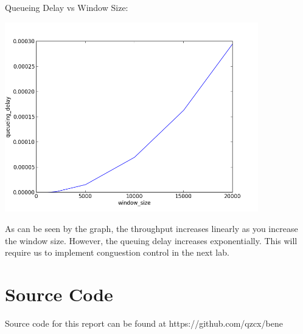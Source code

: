 \documentclass[11pt]{article}
\begin{document}
Queueing Delay vs Window Size:

\includegraphics[width=11cm]{queueing_delay.png}

As can be seen by the graph, the throughput increases linearly as you increase the window size. However, the queuing delay increases exponentially. This will require us to implement conguestion control in the next lab. 

\section{Source Code}

Source code for this report can be found at https://github.com/qzcx/bene
\end{document}
